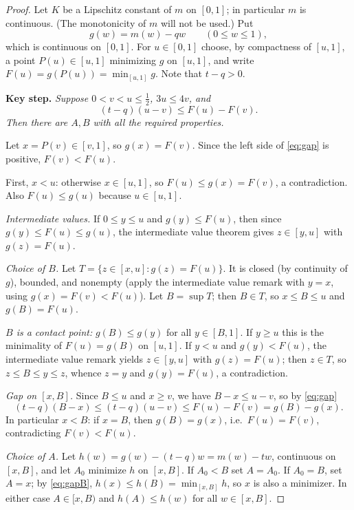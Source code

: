 \begin{proof}
Let $K$ be a Lipschitz constant of $m$ on $[0,1]$; in particular $m$ is continuous. (The monotonicity of $m$ will not be used.) Put
\[
 g(w)=m(w)-qw\qquad(0\le w\le 1),
\]
which is continuous on $[0,1]$. For $u\in[0,1]$ choose, by compactness of $[u,1]$, a point $P(u)\in[u,1]$ minimizing $g$ on $[u,1]$, and write $F(u)=g(P(u))=\min_{[u,1]}g$. Note that $t-q>0$.

\medskip\noindent\textbf{Key step.} \emph{Suppose $0<v<u\le \tfrac12$, $3u\le 4v$, and
\begin{equation}\label{eq:gap}
 (t-q)(u-v)\le F(u)-F(v).
\end{equation}
Then there are $A,B$ with all the required properties.}

Let $x=P(v)\in[v,1]$, so $g(x)=F(v)$. Since the left side of \eqref{eq:gap} is positive, $F(v)<F(u)$.

First, $x<u$: otherwise $x\in[u,1]$, so $F(u)\le g(x)=F(v)$, a contradiction. Also $F(u)\le g(u)$ because $u\in[u,1]$.

\emph{Intermediate values.} If $0\le y\le u$ and $g(y)\le F(u)$, then since $g(y)\le F(u)\le g(u)$, the intermediate value theorem gives $z\in[y,u]$ with $g(z)=F(u)$.

\emph{Choice of $B$.} Let $T=\{z\in[x,u]: g(z)=F(u)\}$. It is closed (by continuity of $g$), bounded, and nonempty (apply the intermediate value remark with $y=x$, using $g(x)=F(v)<F(u)$). Let $B=\sup T$; then $B\in T$, so $x\le B\le u$ and $g(B)=F(u)$.

\emph{$B$ is a contact point:} $g(B)\le g(y)$ for all $y\in[B,1]$. If $y\ge u$ this is the minimality of $F(u)=g(B)$ on $[u,1]$. If $y<u$ and $g(y)<F(u)$, the intermediate value remark yields $z\in[y,u]$ with $g(z)=F(u)$; then $z\in T$, so $z\le B\le y\le z$, whence $z=y$ and $g(y)=F(u)$, a contradiction.

\emph{Gap on $[x,B]$.} Since $B\le u$ and $x\ge v$, we have $B-x\le u-v$, so by \eqref{eq:gap}
\begin{equation}\label{eq:gapB}
 (t-q)(B-x)\le (t-q)(u-v)\le F(u)-F(v)=g(B)-g(x).
\end{equation}
In particular $x<B$: if $x=B$, then $g(B)=g(x)$, i.e.\ $F(u)=F(v)$, contradicting $F(v)<F(u)$.

\emph{Choice of $A$.} Let $h(w)=g(w)-(t-q)w=m(w)-tw$, continuous on $[x,B]$, and let $A_0$ minimize $h$ on $[x,B]$. If $A_0<B$ set $A=A_0$. If $A_0=B$, set $A=x$; by \eqref{eq:gapB}, $h(x)\le h(B)=\min_{[x,B]}h$, so $x$ is also a minimizer. In either case $A\in[x,B)$ and $h(A)\le h(w)$ for all $w\in[x,B]$.


\end{proof}
